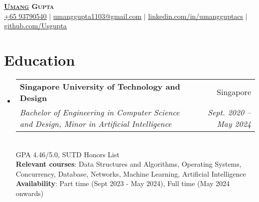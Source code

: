 \documentclass[letterpaper,11pt]{article}
\makeatletter
\newcommand{\resumeSubheading}[4]{
  \vspace{-2pt}\item
    \begin{tabular*}{0.97\textwidth}[t]{l@{\extracolsep{\fill}}r}
      \textbf{#1} & #2 \\
      \textit{\small#3} & \textit{\small #4} \\
    \end{tabular*}\vspace{-7pt}
}
\newcommand{\resumeSubHeadingListStart}{\begin{itemize}[leftmargin=0.15in, label={}]}
\newcommand{\resumeSubHeadingListEnd}{\end{itemize}}
\makeatother
\begin{document}


\begin{center}
    \textbf{\Huge \scshape \underline{Umang} Gupta} \\ \vspace{1pt}
    \small \href{tel:+6593790540}{ \underline {+65 93790540}}
  $|$ \href{mailto:umanggupta1103@gmail.com}{ \underline{umanggupta1103@gmail.com}} $|$ 
    \href{https://linkedin.com/in/umangguptacs}{ \underline{linkedin.com/in/umangguptacs}} $|$\href{https://github.com/Usgupta}{  \underline{github.com/Usgupta}}
\end{center}


\section{Education}
  \resumeSubHeadingListStart
    \resumeSubheading
      {Singapore University of Technology and Design}{Singapore}
      {Bachelor of Engineering in Computer Science and Design, Minor in Artificial Intelligence}{Sept. 2020 -- May 2024}
      \newline{}
    \\{{GPA 4.46/5.0, SUTD Honors List}}
    \\\textbf{Relevant courses}{: Data Structures and Algorithms, Operating Systems, Concurrency, Database, Networks, Machine Learning, Artificial Intelligence}
    \\\textbf{Availability}{: Part time (Sept 2023 - May 2024), Full time (May 2024 onwards)}
  \resumeSubHeadingListEnd


\end{document}
